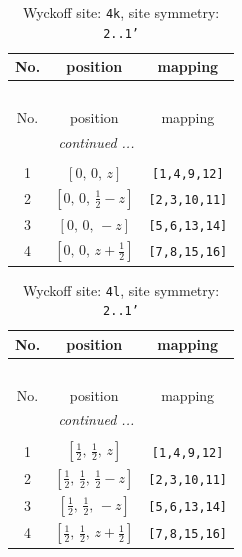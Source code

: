 \documentclass[fleqn,8pt]{jsarticle}
\begin{document}
\renewcommand{\arraystretch}{1.2}
\begin{longtable}{ccc}
\caption{Wyckoff site: {\tt 4k}, site symmetry: {\tt 2..1'}}
 \\
 \hline \hline
No. & position & mapping \\ \hline \endfirsthead

\multicolumn{2}{l}{\tablename\ \thetable{}} \\
 \hline \hline
No. & position & mapping \\ \hline \endhead

 \hline \hline
\multicolumn{2}{r}{\footnotesize\it continued ...} \\ \endfoot

 \hline \hline
\multicolumn{2}{r}{} \\ \endlastfoot

1 & $\left[ 0,\, 0,\, z \right]$ & {\tt [1,4,9,12]} \\ \hline
2 & $\left[ 0,\, 0,\, \frac{1}{2} - z \right]$ & {\tt [2,3,10,11]} \\ \hline
3 & $\left[ 0,\, 0,\, - z \right]$ & {\tt [5,6,13,14]} \\ \hline
4 & $\left[ 0,\, 0,\, z + \frac{1}{2} \right]$ & {\tt [7,8,15,16]} \\
\end{longtable}
\renewcommand{\arraystretch}{1.2}
\begin{longtable}{ccc}
\caption{Wyckoff site: {\tt 4l}, site symmetry: {\tt 2..1'}}
 \\
 \hline \hline
No. & position & mapping \\ \hline \endfirsthead

\multicolumn{2}{l}{\tablename\ \thetable{}} \\
 \hline \hline
No. & position & mapping \\ \hline \endhead

 \hline \hline
\multicolumn{2}{r}{\footnotesize\it continued ...} \\ \endfoot

 \hline \hline
\multicolumn{2}{r}{} \\ \endlastfoot

1 & $\left[ \frac{1}{2},\, \frac{1}{2},\, z \right]$ & {\tt [1,4,9,12]} \\ \hline
2 & $\left[ \frac{1}{2},\, \frac{1}{2},\, \frac{1}{2} - z \right]$ & {\tt [2,3,10,11]} \\ \hline
3 & $\left[ \frac{1}{2},\, \frac{1}{2},\, - z \right]$ & {\tt [5,6,13,14]} \\ \hline
4 & $\left[ \frac{1}{2},\, \frac{1}{2},\, z + \frac{1}{2} \right]$ & {\tt [7,8,15,16]} \\
\end{longtable}
\end{document}
